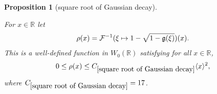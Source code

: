 \documentclass[12pt,reqno]{amsart}
\theoremstyle{plain}
\newtheorem{proposition}[theorem]{Proposition}
\numberwithin{equation}{section}
\theoremstyle{remark}
\newcommand{\uses}[1]{}
\newcommand{\usesdefs}[1]{}
\newcommand{\leanok}{}
\newcommand{\lean}[1]{}
\newcommand{\R}{{\mathbb R}}
\begin{document}
\begin{proposition}[square root of Gaussian decay]\label{square root of Gaussian decay}\uses{auxiliary function B,poisson to abel,Elementary Gaussian properties}\usesdefs{gaussian,bracket bump,auto:Wiener-space-definition}
\lean{Auto.sqrtGaussianDecay}
\leanok
For $x\in\R$ let
\begin{equation}\label{auto:inverse-Fourier-square-root-Gaussian} \rho(x) = \mathcal{F}^{-1}(\xi \mapsto 1- \sqrt{1-\mathfrak{g}(\xi)})(x). \end{equation}
This is a well-defined function in $W_0(\R)$ satisfying for all $x\in\R$,
\begin{equation} \label{sqr gauss C}
    0\le \rho(x) \le C_{\ref{square root of Gaussian decay}} \langle x\rangle^2,
\end{equation}
where $C_{\ref{square root of Gaussian decay}}=17$.
\end{proposition}
\end{document}
